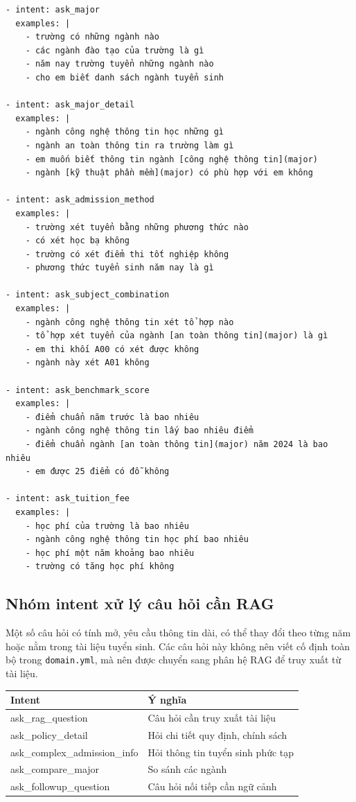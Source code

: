 \begin{verbatim}
- intent: ask_major
  examples: |
    - trường có những ngành nào
    - các ngành đào tạo của trường là gì
    - năm nay trường tuyển những ngành nào
    - cho em biết danh sách ngành tuyển sinh

- intent: ask_major_detail
  examples: |
    - ngành công nghệ thông tin học những gì
    - ngành an toàn thông tin ra trường làm gì
    - em muốn biết thông tin ngành [công nghệ thông tin](major)
    - ngành [kỹ thuật phần mềm](major) có phù hợp với em không

- intent: ask_admission_method
  examples: |
    - trường xét tuyển bằng những phương thức nào
    - có xét học bạ không
    - trường có xét điểm thi tốt nghiệp không
    - phương thức tuyển sinh năm nay là gì

- intent: ask_subject_combination
  examples: |
    - ngành công nghệ thông tin xét tổ hợp nào
    - tổ hợp xét tuyển của ngành [an toàn thông tin](major) là gì
    - em thi khối A00 có xét được không
    - ngành này xét A01 không

- intent: ask_benchmark_score
  examples: |
    - điểm chuẩn năm trước là bao nhiêu
    - ngành công nghệ thông tin lấy bao nhiêu điểm
    - điểm chuẩn ngành [an toàn thông tin](major) năm 2024 là bao nhiêu
    - em được 25 điểm có đỗ không

- intent: ask_tuition_fee
  examples: |
    - học phí của trường là bao nhiêu
    - ngành công nghệ thông tin học phí bao nhiêu
    - học phí một năm khoảng bao nhiêu
    - trường có tăng học phí không
\end{verbatim}

\subsection*{Nhóm intent xử lý câu hỏi cần RAG}

Một số câu hỏi có tính mở, yêu cầu thông tin dài, có thể thay đổi theo từng năm hoặc nằm trong tài liệu tuyển sinh. Các câu hỏi này không nên viết cố định toàn bộ trong \texttt{domain.yml}, mà nên được chuyển sang phân hệ RAG để truy xuất từ tài liệu.

\begin{table}[H]
\centering
\begin{tabular}{|l|p{9cm}|}
\hline
\textbf{Intent} & \textbf{Ý nghĩa} \\
\hline
ask\_rag\_question & Câu hỏi cần truy xuất tài liệu \\
\hline
ask\_policy\_detail & Hỏi chi tiết quy định, chính sách \\
\hline
ask\_complex\_admission\_info & Hỏi thông tin tuyển sinh phức tạp \\
\hline
ask\_compare\_major & So sánh các ngành \\
\hline
ask\_followup\_question & Câu hỏi nối tiếp cần ngữ cảnh \\
\hline
\end{tabular}
\end{table}

